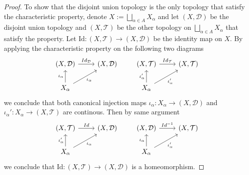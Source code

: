 \documentclass[a4paper]{article}
\theoremstyle{remark}
\newcommand{\Id}{\text{Id}} %
\begin{document}
\begin{proof}
	To show that the disjoint union topology is the only topology that satisfy the characteristic property, denote $X:=\bigsqcup_{\alpha \in A} X_{\alpha}$ and let $(X, \mathcal{D})$ be the disjoint union topology and $(X,\mathcal{T})$ be the other topology on $\bigsqcup_{\alpha \in A} X_{\alpha}$ that satisfy the property. Let $\Id : (X,\mathcal{T}) \to (X,\mathcal{D})$ be the identity map on $X$. By applying the characteristic property on the following two diagrams
	\[
	\begin{tikzcd}
	(X,\mathcal{D}) \arrow[r,"Id_{\mathcal{D}}"] &  (X,\mathcal{D})\\
	X_{\alpha} \arrow[u,"\iota_{\alpha}"] \arrow[ur,"\iota_{\alpha}",swap]& 
	\end{tikzcd}
	\qquad
	\begin{tikzcd}
	(X,\mathcal{T}) \arrow[r,"Id_{\mathcal{T}}"] &  (X,\mathcal{T})\\
	X_{\alpha} \arrow[u,"\iota'_{\alpha}"] \arrow[ur,"\iota'_{\alpha}",swap]& 
	\end{tikzcd}
	\]
    we conclude that both canonical injection maps $\iota_{\alpha} : X_{\alpha} \to (X,\mathcal{D})$ and $\iota_{\alpha}' : X_{\alpha} \to (X,\mathcal{T})$ are continous. Then by same argument
    \[
    \begin{tikzcd}
    (X,\mathcal{T}) \arrow[r,"Id"] &  (X,\mathcal{D})\\
    X_{\alpha} \arrow[u,"\iota'_{\alpha}"] \arrow[ur,"\iota_{\alpha}",swap]& 
    \end{tikzcd}
    \qquad
    \begin{tikzcd}
    (X,\mathcal{D}) \arrow[r,"Id^{-1}"] &  (X,\mathcal{T})\\
    X_{\alpha} \arrow[u,"\iota_{\alpha}"] \arrow[ur,"\iota'_{\alpha}",swap]& 
    \end{tikzcd}
    \]
    we conclude that $\Id : (X,\mathcal{T}) \to (X,\mathcal{D})$ is a homeomorphism.
\end{proof}
\end{document}
